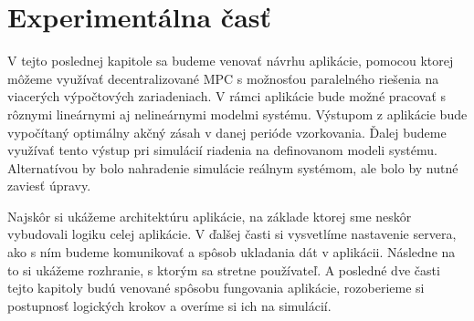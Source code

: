 \chapter{Experimentálna časť}
\label{part:Aplikacia}

V tejto poslednej kapitole sa budeme venovať návrhu aplikácie, pomocou ktorej môžeme využívať decentralizované MPC s možnosťou paralelného riešenia na viacerých výpočtových zariadeniach. V rámci aplikácie bude možné pracovať s rôznymi lineárnymi aj nelineárnymi modelmi systému. Výstupom z aplikácie bude vypočítaný optimálny akčný zásah v danej perióde vzorkovania. Ďalej budeme využívať tento výstup pri simulácií riadenia na definovanom modeli systému. Alternatívou by bolo nahradenie simulácie reálnym systémom, ale bolo by nutné zaviesť úpravy. 

Najskôr si ukážeme architektúru aplikácie, na základe ktorej sme neskôr vybudovali logiku celej aplikácie. V ďalšej časti si vysvetlíme nastavenie servera, ako s ním budeme komunikovať a spôsob ukladania dát v aplikácii. Následne na to si ukážeme rozhranie, s ktorým sa stretne používateľ. A posledné dve časti tejto kapitoly budú venované spôsobu fungovania aplikácie, rozoberieme si postupnosť logických krokov a overíme si ich na simulácií. 
